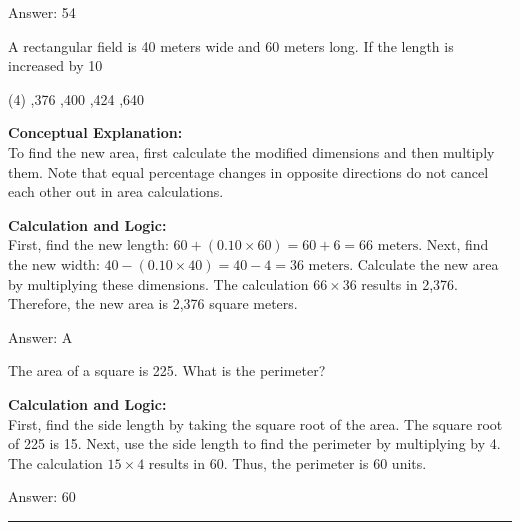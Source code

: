 \documentclass[11pt,paper=a4,answers]{exam}
\begin{document}
\begin{questions}
\begin{solution}
\vspace{30pt}

Answer: \colorbox{yellow!100}{54}
\end{solution}

\vspace{60pt}

\question
A rectangular field is 40 meters wide and 60 meters long. If the length is increased by 10%
\begin{tasks}(4)
    ,376
    ,400
    ,424
    ,640
\end{tasks}

\begin{solution}
\textbf{Conceptual Explanation:} \\
To find the new area, first calculate the modified dimensions and then multiply them. Note that equal percentage changes in opposite directions do not cancel each other out in area calculations.

\vspace{30pt}

\textbf{Calculation and Logic:} \\
First, find the new length: $60 + (0.10 \times 60) = 60 + 6 = 66 \text{ meters}$. Next, find the new width: $40 - (0.10 \times 40) = 40 - 4 = 36 \text{ meters}$. Calculate the new area by multiplying these dimensions. The calculation $66 \times 36$ results in 2,376. Therefore, the new area is 2,376 square meters.

\vspace{30pt}

Answer: \colorbox{yellow!100}{A}
\end{solution}

\vspace{60pt}

\question
The area of a square is 225. What is the perimeter?

\begin{solution}
\textbf{Calculation and Logic:} \\
First, find the side length by taking the square root of the area. The square root of 225 is 15. Next, use the side length to find the perimeter by multiplying by 4. The calculation $15 \times 4$ results in 60. Thus, the perimeter is 60 units.

\vspace{30pt}

Answer: \colorbox{yellow!100}{60}
\end{solution}



\end{questions}
\begin{center}
\rule{.5\textwidth}{1pt}
\end{center}
\end{document}

